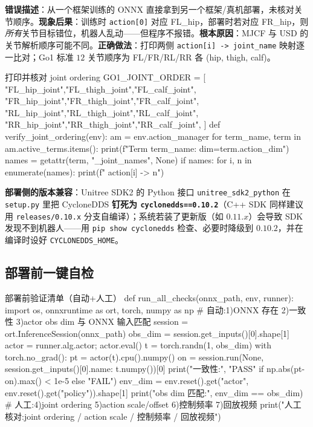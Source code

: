 \begin{pitfall}
\textbf{错误描述}：从一个框架训练的 ONNX 直接拿到另一个框架/真机部署，未核对关节顺序。\textbf{现象后果}：训练时 \verb|action[0]| 对应 FL\_hip，部署时若对应 FR\_hip，则\emph{所有}关节目标错位，机器人乱动——但程序不报错。\textbf{根本原因}：MJCF 与 USD 的关节解析顺序可能不同。\textbf{正确做法}：打印两侧 \verb|action[i] -> joint_name| 映射逐一比对；Go1 标准 $12$ 关节顺序为 FL/FR/RL/RR 各 (hip, thigh, calf)。
\end{pitfall}

\begin{codebox}[Python]{打印并核对 joint ordering}
GO1_JOINT_ORDER = [
    "FL_hip_joint","FL_thigh_joint","FL_calf_joint",
    "FR_hip_joint","FR_thigh_joint","FR_calf_joint",
    "RL_hip_joint","RL_thigh_joint","RL_calf_joint",
    "RR_hip_joint","RR_thigh_joint","RR_calf_joint",
]
def verify_joint_ordering(env):
    am = env.action_manager
    for term_name, term in am.active_terms.items():
        print(f"Term {term_name}: dim={term.action_dim}")
        names = getattr(term, "_joint_names", None)
        if names:
            for i, n in enumerate(names):
                print(f"  action[{i}] -> {n}")
\end{codebox}

\begin{note}
\textbf{部署侧的版本兼容}：Unitree SDK2 的 Python 接口 \verb|unitree_sdk2_python| 在 \verb|setup.py| 里把 CycloneDDS \textbf{钉死为 \texttt{cyclonedds==0.10.2}}（C++ SDK 同样建议用 \verb|releases/0.10.x| 分支自编译）；系统若装了更新版（如 $0.11.x$）会导致 SDK 发现不到机器人——用 \verb|pip show cyclonedds| 检查、必要时降级到 $0.10.2$，并在编译时设好 \verb|CYCLONEDDS_HOME|。
\end{note}

\subsection{部署前一键自检}

\begin{codebox}[Python]{部署前验证清单（自动+人工）}
def run_all_checks(onnx_path, env, runner):
    import os, onnxruntime as ort, torch, numpy as np
    # 自动:1)ONNX 存在 2)一致性 3)actor obs dim 与 ONNX 输入匹配
    session = ort.InferenceSession(onnx_path)
    obs_dim = session.get_inputs()[0].shape[1]
    actor = runner.alg.actor; actor.eval()
    t = torch.randn(1, obs_dim)
    with torch.no_grad():
        pt = actor(t).cpu().numpy()
    on = session.run(None, {session.get_inputs()[0].name: t.numpy()})[0]
    print("一致性:", "PASS" if np.abs(pt-on).max() < 1e-5 else "FAIL")
    env_dim = env.reset().get("actor", env.reset().get("policy")).shape[1]
    print("obs dim 匹配:", env_dim == obs_dim)
    # 人工:4)joint ordering 5)action scale/offset 6)控制频率 7)回放视频
    print("人工核对:joint ordering / action scale / 控制频率 / 回放视频")
\end{codebox}

